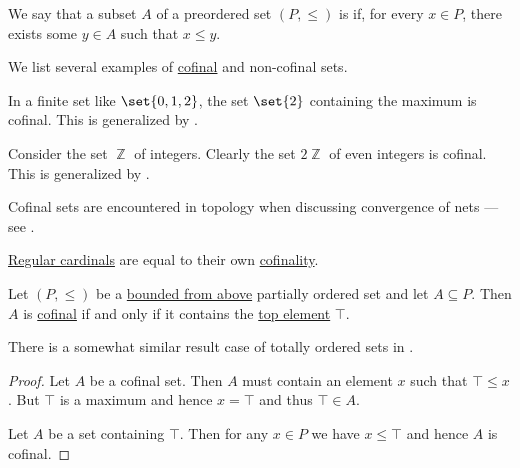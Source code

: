 \begin{definition}\label{def:cofinal_set}
  We say that a subset \( A \) of a preordered set \( (P, \leq) \) is  if, for every \( x \in P \), there exists some \( y \in A \) such that \( x \leq y \).
\end{definition}

\begin{example}\label{ex:def:cofinal_set}
  We list several examples of \hyperref[def:cofinal_set]{cofinal} and non-cofinal sets.

  \begin{itemize}
     In a finite set like \( \set{ 0, 1, 2 } \), the set \( \set{ 2 } \) containing the maximum is cofinal. This is generalized by .

     Consider the set \( \BbbZ \) of integers. Clearly the set \( 2\BbbZ \) of even integers is cofinal. This is generalized by .

     Cofinal sets are encountered in topology when discussing convergence of nets --- see .

     \hyperref[def:regular_cardinal]{Regular cardinals} are equal to their own \hyperref[def:cofinality]{cofinality}.
  \end{itemize}
\end{example}

\begin{proposition}\label{thm:partially_ordered_cofinal_equivalences}
  Let \( (P, \leq) \) be a \hyperref[def:extremal_points/upper_and_lower_bounds]{bounded from above} partially ordered set and let \( A \subseteq P \). Then \( A \) is \hyperref[def:cofinal_set]{cofinal} if and only if it contains the \hyperref[def:extremal_points/top_and_bottom]{top element} \( \top \).
\end{proposition}
\begin{comments}
  \item There is a somewhat similar result case of totally ordered sets in .
\end{comments}
\begin{proof}
  \SufficiencySubProof Let \( A \) be a cofinal set. Then \( A \) must contain an element \( x \) such that \( \top \leq x \). But \( \top \) is a maximum and hence \( x = \top \) and thus \( \top \in A \).

  \NecessitySubProof Let \( A \) be a set containing \( \top \). Then for any \( x \in P \) we have \( x \leq \top \) and hence \( A \) is cofinal.
\end{proof}

